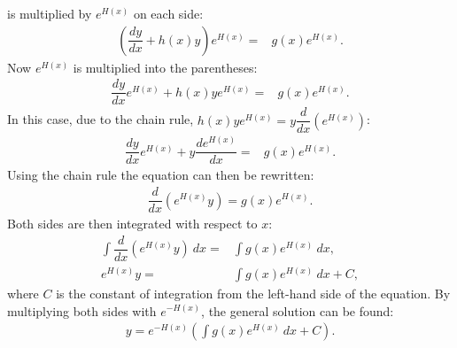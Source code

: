 \begin{prof}{}{}
 is multiplied by $e^{H(x)}$ on each side:
\begin{align*}
\left(\dfrac{dy}{dx}+h(x)y\right)e^{H(x)}=& g(x)e^{H(x)}.
\end{align*}
Now $e^{H(x)}$ is multiplied into the parentheses:
\begin{align*}
\dfrac{dy}{dx}e^{H(x)}+h(x)ye^{H(x)}=& g(x)e^{H(x)}.
\end{align*}
In this case, due to the chain rule, $h(x)ye^{H(x)} = y  \dfrac{d}{dx} \left(e^{H(x)} \right)$:
\begin{align*}
\dfrac{dy}{dx}  e^{H(x)} + y  \dfrac{de^{H(x)}}{dx}=& g(x)e^{H(x)}.
\end{align*}
Using the chain rule the equation can then be rewritten:
\begin{align*}
\dfrac{d}{dx}\left(e^{H(x)}y\right)=g(x)e^{H(x)}.
\end{align*}
Both sides are then integrated with respect to $x$:
\begin{align*}
\int\dfrac{d}{dx}\left(e^{H(x)}y\right)\ dx=&\int g(x)e^{H(x)}\ dx,
\\
e^{H(x)}y=&\int g(x)e^{H(x)}\ dx+C,
\end{align*}
where $C$ is the constant of integration from the left-hand side of the  equation. By multiplying both sides with $e^{-H(x)}$, the general solution can be found:
\begin{align*}
y=e^{-H(x)}\left(\int g(x)e^{H(x)}\ dx+C\right).
\end{align*}
\end{prof}


